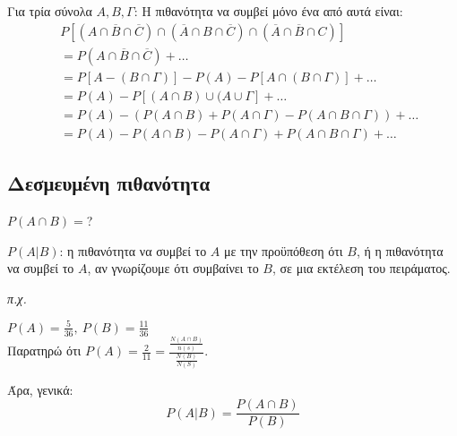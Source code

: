 \documentclass[11pt,a4paper,titlepage,draft]{article}
\begin{document}
\subsubsection{}
Για τρία σύνολα \(A,B, \Gamma \): Η πιθανότητα να συμβεί μόνο ένα από αυτά είναι: 
\begin{align*}
& P\left[
\left( A \cap \overline{B} \cap \overline{C} \right) \cap
\left( \overline{A} \cap B \cap \overline{C} \right) \cap
\left( \overline{A} \cap \overline{B} \cap C \right) \right] \\ &= 
P(A \cap \overline{B} \cap \overline{C}) + \dots \\ &= 
P\left[ A - (B \cap \Gamma )\right]
-P(A)-P \left[ A \cap (B \cap \Gamma ) \right] + \dots
\\ &= 
P(A) - P \left[ (A \cap B) \cup (A \cup \Gamma \right]+ \dots  \\ &= 
P(A) - \left( P(A \cap B) + P(A \cap \Gamma) - P(A\cap B\cap \Gamma ) \right)+ \dots  \\\ &=
P(A) - P(A \cap B) - P(A \cap \Gamma) + P(A \cap B \cap \Gamma)+ \dots
\end{align*}

\subsection{Δεσμευμένη πιθανότητα}
\(P(A\cap B) =\)?

\(P(A|B)\): η πιθανότητα να συμβεί το $A$ με την προϋπόθεση ότι $B$, ή η πιθανότητα να συμβεί το $A$, αν γνωρίζουμε ότι συμβαίνει το $B$, σε μια εκτέλεση του πειράματος.

\textit{π.χ.}


\(P(A) = \frac{5}{36},\ P(B) = \frac{11}{36}\) \\
Παρατηρώ ότι \(P(A)=\frac{2}{11} = \frac{\frac{N(A\cap B)}{n(s)}}{\frac{N(B)}{N(S)}}\).

Άρα, γενικά:
\[P \left( A | B \right) = \frac{P(A \cap B)}{P(B)} \]
\end{document}
